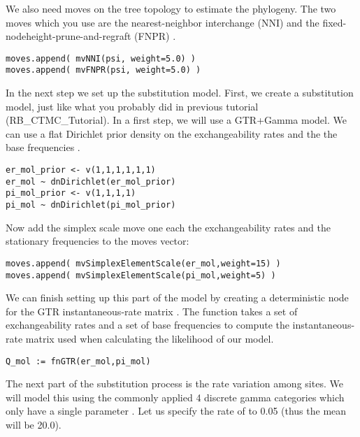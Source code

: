 We also need moves on the tree topology to estimate the phylogeny. The two moves which you use are the nearest-neighbor interchange (NNI) and the fixed-nodeheight-prune-and-regraft (FNPR) \citep{Hoehna2012}.
{\tt \small \begin{snugshade*}
\begin{lstlisting}
moves.append( mvNNI(psi, weight=5.0) )
moves.append( mvFNPR(psi, weight=5.0) )\end{lstlisting}
\end{snugshade*}}


In the next step we set up the substitution model.
First, we create a substitution model, just like what you probably did in previous tutorial (\EG RB\_CTMC\_Tutorial). 
In a first step, we will use a GTR+Gamma model.
We can use a flat Dirichlet prior density on the exchangeability rates  and the the base frequencies .
{\tt \begin{snugshade*}
\begin{lstlisting}
er_mol_prior <- v(1,1,1,1,1,1) 
er_mol ~ dnDirichlet(er_mol_prior)
pi_mol_prior <- v(1,1,1,1) 
pi_mol ~ dnDirichlet(pi_mol_prior)
\end{lstlisting}
\end{snugshade*}}
Now add the simplex scale move one each the exchangeability rates  and the stationary frequencies  to the moves vector:
{\tt \small \begin{snugshade*}
\begin{lstlisting}
moves.append( mvSimplexElementScale(er_mol,weight=15) )
moves.append( mvSimplexElementScale(pi_mol,weight=5) )
\end{lstlisting}
\end{snugshade*}}
We can finish setting up this part of the model by creating a deterministic node for the GTR instantaneous-rate matrix . 
The  function takes a set of exchangeability rates and a set of base frequencies to compute the instantaneous-rate matrix used when calculating the likelihood of our model.
{\tt \begin{snugshade*}
\begin{lstlisting}
Q_mol := fnGTR(er_mol,pi_mol)
\end{lstlisting}
\end{snugshade*}}
The next part of the substitution process is the rate variation among sites. We will model this using the commonly applied 4 discrete gamma categories which only have a single parameter .
Let us specify the rate of  to 0.05 (thus the mean will be 20.0).
